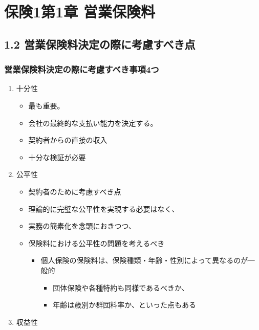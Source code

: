 \documentclass[report,gutter=10mm,fore-edge=10mm,uplatex,dvipdfmx]{jlreq}
\begin{document}
\chapter{保険1第1章  営業保険料}

\section{1.2 営業保険料決定の際に考慮すべき点}

\subsection{営業保険料決定の際に考慮すべき事項4つ}


\begin{enumerate}
    \tightlist
\item  十分性
  \begin{itemize}
    \tightlist
  \item
    最も重要。
  \item
    会社の最終的な支払い能力を決定する。
  \item
    契約者からの直接の収入
  \item
    十分な検証が必要
  \end{itemize}
\item
  公平性

  \begin{itemize}
    \tightlist
  \item
    契約者のために考慮すべき点
  \item
    理論的に完璧な公平性を実現する必要はなく、
  \item
    実務の簡素化を念頭におきつつ、
  \item
    保険料における公平性の問題を考えるべき

    \begin{itemize}
    \tightlist
    \item
      個人保険の保険料は、保険種類・年齢・性別によって異なるのが一般的

      \begin{itemize}
      \tightlist
      \item
        団体保険や各種特約も同様であるべきか、
      \item
        年齢は歳別か群団料率か、といった点もある
      \end{itemize}
    \end{itemize}
  \end{itemize}
\item
  収益性


\end{enumerate}
\end{document}
